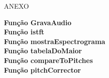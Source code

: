 \vspace*{\fill}
\begingroup
\centering

\huge{ANEXO}

\endgroup
\vspace*{\fill}

\newpage
\textbf{Função GravaAudio}
\\


\textbf{Função istft}
\\


\textbf{Função mostraEspectrograma}
\\


\textbf{Função tabelaDoMaior}
\\


\textbf{Função compareToPitches}
\\


\textbf{Função pitchCorrector}
\\
